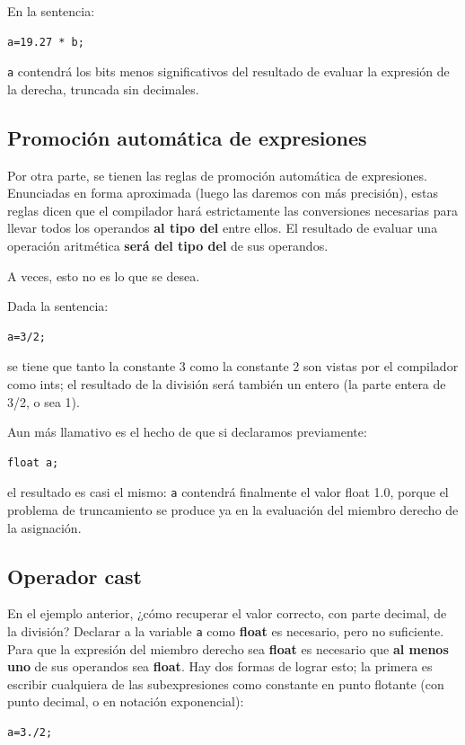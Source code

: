 En la sentencia:
\begin{lstlisting}
a=19.27 * b;	
\end{lstlisting}
\lstinline{a} contendrá los bits menos significativos del resultado de evaluar la expresión de la
derecha, truncada sin decimales.

\subsection{Promoción automática de expresiones}

Por otra parte, se tienen las reglas de promoción automática de expresiones. Enunciadas en forma
aproximada (luego las daremos con más precisión), estas reglas dicen que el compilador hará
estrictamente las conversiones necesarias para llevar todos los operandos \textbf{al tipo del } entre ellos. El
resultado de evaluar una operación aritmética \textbf{será del tipo del } de sus operandos.

A veces, esto no es lo que se desea. 

\begin{ejemplo}
Dada la sentencia:
\begin{lstlisting}
a=3/2;
\end{lstlisting}

se tiene que tanto la constante 3 como la constante 2 son vistas por el compilador como ints; el
resultado de la división será también un entero (la parte entera de 3/2, o sea 1). 

Aun más llamativo es el hecho de que si declaramos previamente:
\begin{lstlisting}
float a;
\end{lstlisting}
el resultado es casi el mismo: \lstinline{a} contendrá finalmente el valor float 1.0, porque el problema de truncamiento se produce ya en la evaluación del miembro derecho de la asignación.
\end{ejemplo}


\subsection{Operador cast}
En el ejemplo anterior, ¿cómo recuperar el valor correcto, con parte decimal, de la división? Declarar a la variable \lstinline{a} como \textbf{float} es necesario,
pero no suficiente. Para que la expresión del miembro derecho sea \textbf{float} es necesario que \textbf{al menos uno}
de sus operandos sea \textbf{float}. Hay dos formas de lograr esto; la primera es escribir cualquiera de las
subexpresiones como constante en punto flotante (con punto decimal, o en notación exponencial):
\begin{lstlisting}
a=3./2;
\end{lstlisting}

